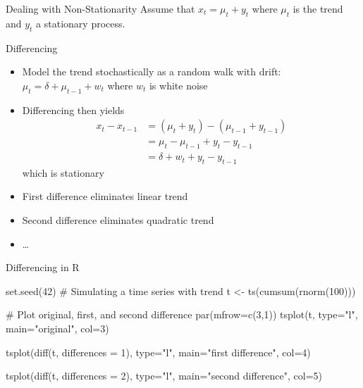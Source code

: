 \documentclass[ignorenonframetext,xcolor=x11names]{beamer}
\begin{document}

\begin{frame}{Dealing with Non-Stationarity}
Assume that $x_t = \mu_t + y_t$ where $\mu_t$ is the trend and $y_t$ a stationary process.
\begin{block}{Differencing}
\begin{itemize}
  \item Model the trend stochastically as a random walk with drift: $\mu_t = \delta + \mu_{t-1} + w_t$ where $w_t$ is white noise
  \item Differencing then yields 
  \begin{align*}x_t - x_{t-1} &= (\mu_t + y_t) - (\mu_{t-1} + y_{t-1})  \\
  &= \mu_t - \mu_{t-1} + y_t - y_{t-1} \\
  &= \delta + w_t + y_t - y_{t-1}
  \end{align*}
  which is stationary
\end{itemize}
\end{block}
\begin{itemize}
  \item First difference eliminates linear trend
  \item Second difference eliminates quadratic trend
  \item \ldots
\end{itemize}
\end{frame}

\begin{frame}[fragile]{Differencing in R}
\begin{Rcode}
set.seed(42)
# Simulating a time series with trend
t <- ts(cumsum(rnorm(100))) 

# Plot original, first, and second difference
par(mfrow=c(3,1))
tsplot(t, type="l", 
    main="original", col=3)

tsplot(diff(t, differences = 1), type="l", 
    main="first difference", col=4)

tsplot(diff(t, differences = 2), type="l", 
    main="second difference", col=5)
\end{Rcode}
\end{frame}
\end{document}
